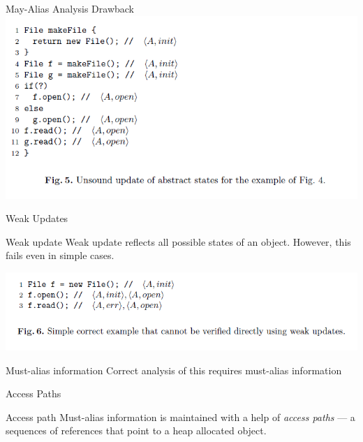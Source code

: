 \documentclass{beamer}
\begin{document}
\begin{frame}{May-Alias Analysis Drawback}
	\includegraphics[width=\paperwidth]{fig5.png}
\end{frame}

\begin{frame}{Weak Updates}
	\begin{block}{Weak update}
		Weak update reflects all possible states of an object.
		\newline
		However, this fails even in simple cases.
	\end{block}
	\includegraphics[width=0.9\paperwidth]{fig6.png}
	\begin{block}{Must-alias information}
		Correct analysis of this requires must-alias information
	\end{block}
\end{frame}

\begin{frame}{Access Paths}
	\begin{block}{Access path}
		Must-alias information is maintained with a help of \textit{access paths} --- a sequences of references
		that point to a heap allocated object. 
	\end{block}
\end{frame}
\end{document}
